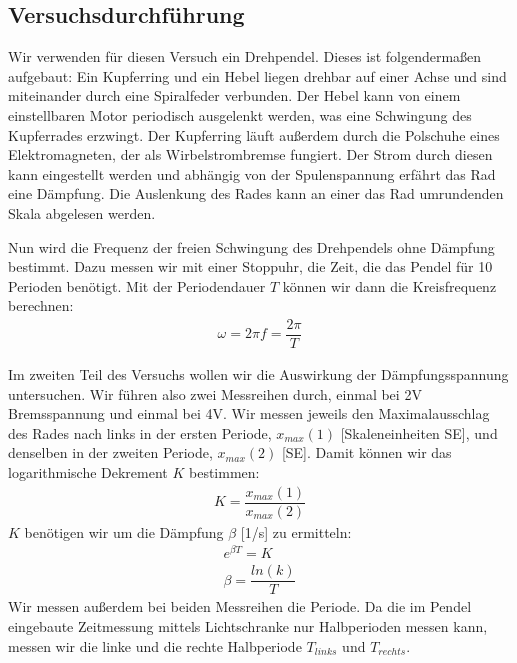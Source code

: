 \documentclass{scrartcl}
\begin{document}
\subsection{Versuchsdurchführung}
Wir verwenden für diesen Versuch ein Drehpendel. Dieses ist folgendermaßen aufgebaut: Ein  Kupferring und ein Hebel liegen drehbar auf einer Achse und sind miteinander durch eine Spiralfeder verbunden. Der Hebel kann von einem einstellbaren Motor periodisch ausgelenkt werden, was eine Schwingung des Kupferrades erzwingt.
Der Kupferring läuft außerdem durch die Polschuhe eines Elektromagneten, der als Wirbelstrombremse fungiert. Der Strom durch diesen kann eingestellt werden und abhängig von der Spulenspannung erfährt das Rad eine Dämpfung. Die Auslenkung des Rades kann an einer das Rad umrundenden Skala abgelesen werden.

Nun wird die Frequenz der freien Schwingung des Drehpendels ohne Dämpfung bestimmt. Dazu messen wir mit einer Stoppuhr, die Zeit, die das Pendel für 10 Perioden benötigt. Mit der Periodendauer $T$ können wir dann die Kreisfrequenz berechnen:
\begin{align*}
\omega = 2 \pi f = \dfrac{2 \pi}{T} 
\end{align*}

Im zweiten Teil des Versuchs wollen wir die Auswirkung der Dämpfungsspannung untersuchen. Wir führen also zwei Messreihen durch, einmal bei 2V Bremsspannung und einmal bei 4V. Wir messen jeweils den Maximalausschlag des Rades nach links in der ersten Periode, $x_{max}(1)$ [Skaleneinheiten SE], und denselben in der zweiten Periode, $x_{max}(2)$ [SE]. Damit können wir das logarithmische Dekrement $K$ bestimmen:
\begin{align*}
K = \dfrac{x_{max}(1)}{x_{max}(2)}
\end{align*}
$K$ benötigen wir um die Dämpfung $\beta$ [1/s] zu ermitteln:
\begin{align*}
e^{\beta T} = K \\
\beta = \dfrac{ln(k)}{T}
\end{align*}
Wir messen außerdem bei beiden Messreihen die Periode. Da die im Pendel eingebaute Zeitmessung mittels Lichtschranke nur Halbperioden messen kann, messen wir die linke und die rechte Halbperiode $T_{links}$ und $T_{rechts}$.
\end{document}
